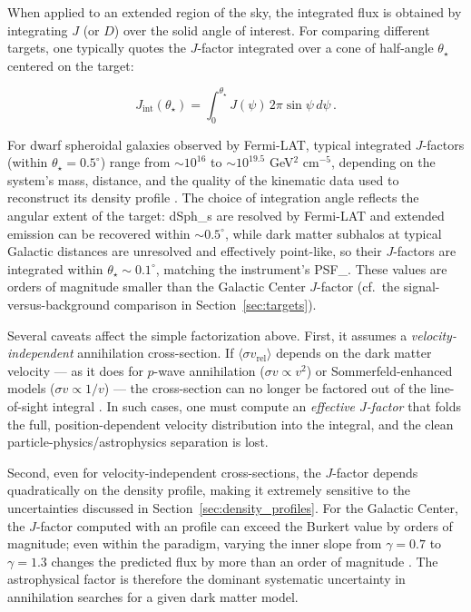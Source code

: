 When applied to an extended region of the sky, the integrated flux is obtained by integrating $J$ (or $D$) over the solid angle of interest.
For comparing different targets, one typically quotes the $J$-factor integrated over a cone of half-angle $\theta_\star$ centered on the target:

\begin{equation}
	J_\text{int}(\theta_\star) = \int_0^{\theta_\star} J(\psi) \, 2\pi \sin\psi \, d\psi \,.
	\label{eq:jfactor_int}
\end{equation}

For dwarf spheroidal galaxies observed by Fermi-LAT, typical integrated $J$-factors (within $\theta_\star = 0.5^\circ$) range from $\sim 10^{16}$ to $\sim 10^{19.5}$ GeV$^2$ cm$^{-5}$, depending on the system's mass, distance, and the quality of the kinematic data used to reconstruct its density profile \cite{Hooper:2024,Bonnivard:2015xpq}.
The choice of integration angle reflects the angular extent of the target: \glspl{dSph_} are resolved by Fermi-LAT and extended emission can be recovered within $\sim 0.5^\circ$, while dark matter subhalos at typical Galactic distances are unresolved and effectively point-like, so their $J$-factors are integrated within $\theta_\star \sim 0.1^\circ$, matching the instrument's \gls{PSF_}.
These values are orders of magnitude smaller than the Galactic Center $J$-factor (cf.\ the signal-versus-background comparison in Section~\ref{sec:targets}).

Several caveats affect the simple factorization above.
First, it assumes a \textit{velocity-independent} annihilation cross-section.
If $\langle \sigma v_\text{rel} \rangle$ depends on the dark matter velocity --- as it does for $p$-wave annihilation ($\sigma v \propto v^2$) or Sommerfeld-enhanced models ($\sigma v \propto 1/v$) --- the cross-section can no longer be factored out of the line-of-sight integral \cite{Cirelli:2024ssz}.
In such cases, one must compute an \textit{effective $J$-factor} that folds the full, position-dependent velocity distribution into the integral, and the clean particle-physics/astrophysics separation is lost.

Second, even for velocity-independent cross-sections, the $J$-factor depends quadratically on the density profile, making it extremely sensitive to the uncertainties discussed in Section~\ref{sec:density_profiles}.
For the Galactic Center, the $J$-factor computed with an \NFW profile can exceed the Burkert value by orders of magnitude; even within the \NFW paradigm, varying the inner slope from $\gamma = 0.7$ to $\gamma = 1.3$ changes the predicted flux by more than an order of magnitude \cite{Hooper:2024}.
The astrophysical factor is therefore the dominant systematic uncertainty in annihilation searches for a given dark matter model.

